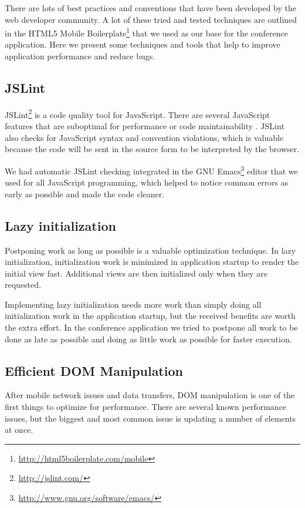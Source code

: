 There are lots of best practices and conventions that have been
developed by the web developer community. A lot of these tried and
tested techniques are outlined in the HTML5 Mobile
Boilerplate\footnote{\url{http://html5boilerplate.com/mobile}} that we
used as our base for the conference application. Here we present some
techniques and tools that help to improve application performance and
reduce bugs.

\subsection{JSLint}

JSLint\footnote{\url{http://jslint.com/}} is a code quality tool for
JavaScript. There are several JavaScript features that are suboptimal
for performance or code maintainability
\cite{crockford2008javascript}. JSLint also checks for JavaScript
syntax and convention violations, which is valuable because the code
will be sent in the source form to be interpreted by the browser.

We had automatic JSLint checking integrated in the GNU
Emacs\footnote{\url{http://www.gnu.org/software/emacs/}} editor that
we used for all JavaScript programming, which helped to notice common
errors as early as possible and made the code cleaner.

\subsection{Lazy initialization}

Postponing work as long as possible is a valuable optimization
technique. In lazy initialization, initialization work is minimized in
application startup to render the initial view fast. Additional views
are then initialized only when they are requested.

Implementing lazy initialization needs more work than simply doing all
initialization work in the application startup, but the received
benefits are worth the extra effort. In the conference application we
tried to postpone all work to be done as late as possible and doing as
little work as possible for faster execution.

\subsection{Efficient DOM Manipulation}

After mobile network issues and data transfers, DOM manipulation is
one of the first things to optimize for performance. There are several
known performance issues, but the biggest and most common issue is
updating a number of elements at once. \cite{zakas2010high}

